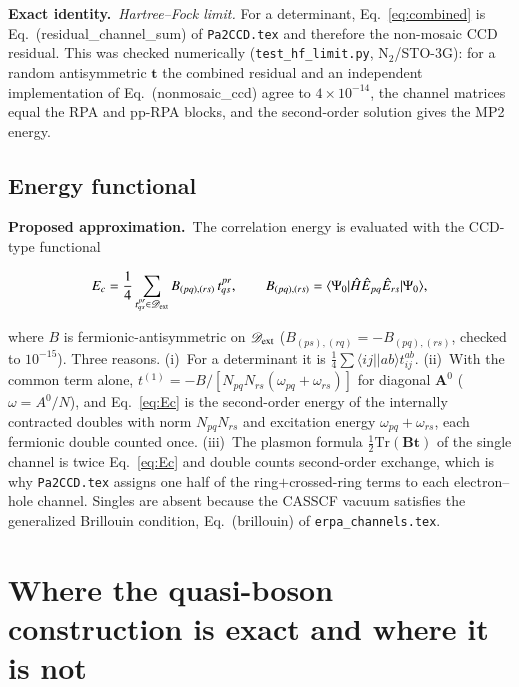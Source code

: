 \documentclass[aip,jcp,reprint,noshowkeys,superscriptaddress]{revtex4-1}
\newcommand{\bA}{\boldsymbol{A}}
\newcommand{\bB}{\boldsymbol{B}}
\newcommand{\Exact}{\textbf{Exact identity.}\ }
\newcommand{\Proposed}{\textbf{Proposed approximation.}\ }
\newcommand{\bt}{\boldsymbol{t}}
\begin{document}
\Exact \emph{Hartree--Fock limit.}  For a determinant,
Eq.~\eqref{eq:combined} is Eq.~(residual\_channel\_sum) of
\texttt{Pa2CCD.tex} and therefore the non-mosaic CCD residual.  This was
checked numerically (\texttt{test\_hf\_limit.py}, N$_2$/STO-3G): for a
random antisymmetric $\bt$ the combined residual and an independent
implementation of Eq.~(nonmosaic\_ccd) agree to $4\times10^{-14}$, the
channel matrices equal the RPA and pp-RPA blocks, and the second-order
solution gives the MP2 energy.

\subsection{Energy functional}
\label{sec:energy}

\Proposed The correlation energy is evaluated with the CCD-type functional
\begin{widetext}
\begin{equation}
  E_c=\frac14\sum_{t^{pr}_{qs}\in\mathscr D_{\rm ext}}B_{(pq),(rs)}\,t^{pr}_{qs},
  \qquad B_{(pq),(rs)}=\langle\Psi_0|\hat H\hat E_{pq}\hat E_{rs}|\Psi_0\rangle ,
  \label{eq:Ec}
\end{equation}
\end{widetext}
where $B$ is fermionic-antisymmetric on $\mathscr D_{\rm ext}$
($B_{(ps),(rq)}=-B_{(pq),(rs)}$, checked to $10^{-15}$).  Three reasons.
(i)~For a determinant it is $\tfrac14\sum\langle ij||ab\rangle t^{ab}_{ij}$.
(ii)~With the common term alone, $t^{(1)}=-B/[N_{pq}N_{rs}(\omega_{pq}+\omega_{rs})]$
for diagonal $\bA^0$ ($\omega=A^0/N$), and Eq.~\eqref{eq:Ec} is the
second-order energy of the internally contracted doubles with norm
$N_{pq}N_{rs}$ and excitation energy $\omega_{pq}+\omega_{rs}$, each
fermionic double counted once.  (iii)~The plasmon formula $\tfrac12\mathrm{Tr}(\bB\bt)$
of the single channel is twice Eq.~\eqref{eq:Ec} and double counts
second-order exchange, which is why \texttt{Pa2CCD.tex} assigns one half of
the ring$+$crossed-ring terms to each electron--hole channel.  Singles are
absent because the CASSCF vacuum satisfies the generalized Brillouin
condition, Eq.~(brillouin) of \texttt{erpa\_channels.tex}.

\section{Where the quasi-boson construction is exact and where it is not}
\label{sec:validity}
\end{document}
